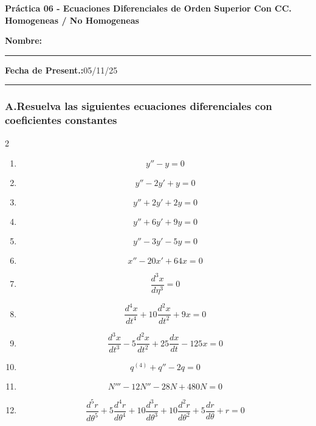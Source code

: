 \documentclass[a4paper,12pt]{article}
\begin{document}
\begin{center}
    \Large\textbf{Práctica 06 - Ecuaciones Diferenciales de Orden Superior Con CC. Homogeneas / No Homogeneas}\\[1cm]  

\end{center}
  \textbf{Nombre:} \rule{7.5cm}{0.4pt}  \textbf{Fecha de Present.:}05/11/25  \rule{0.5cm}{0.4pt} 



\subsubsection*{A.Resuelva las siguientes ecuaciones diferenciales con coeficientes constantes}

\begin{multicols}{2}
\begin{enumerate}

\item 
\[
y'' - y = 0
\]

\item 
\[
y'' - 2y' + y = 0
\]

\item 
\[
y'' + 2y' + 2y = 0
\]

\item 
\[
y'' + 6y' + 9y = 0
\]

\item 
\[
y'' - 3y' - 5y = 0
\]

\item 
\[
x'' - 20x' + 64x = 0
\]

\item 
\[
\frac{d^3x}{d\eta^3} = 0
\]

\item 
\[
\frac{d^4x}{dt^4} + 10\frac{d^2x}{dt^2} + 9x = 0
\]

\item 
\[
\frac{d^3x}{dt^3} - 5\frac{d^2x}{dt^2} + 25\frac{dx}{dt} - 125x = 0
\]

\item 
\[
q^{(4)} + q'' - 2q = 0
\]

\item 
\[
N''' - 12N'' - 28N + 480N = 0
\]

\item 
\[
\frac{d^5r}{d\theta^5} + 5\frac{d^4r}{d\theta^4} + 10\frac{d^3r}{d\theta^3} + 10\frac{d^2r}{d\theta^2} + 5\frac{dr}{d\theta} + r = 0
\]
\end{enumerate}
\end{multicols}
\end{document}
